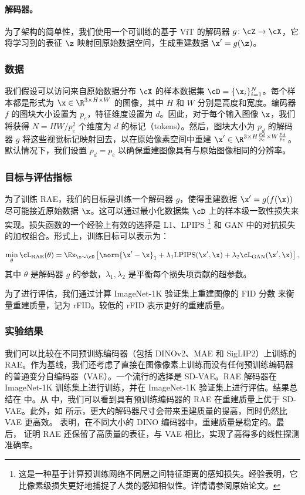 \documentclass[../../book-main_zh.tex]{subfiles}
\begin{document}
\paragraph{解码器。} 为了架构的简单性，我们使用一个可训练的基于 ViT 的解码器 $g \colon \cZ \to \cX$，它将学习到的表征 $\z$ 映射回原始数据空间，生成重建数据 $\x' = g(\z)$。

\subsubsection{数据}
我们假设可以访问来自原始数据分布 $\cX$ 的样本数据集 $\cD = \{\x_i\}_{i=1}^N$。每个样本都是形式为 $\x \in \R^{3 \times H \times W}$ 的图像，其中 $H$ 和 $W$ 分别是高度和宽度。编码器 $f$ 的图块大小设置为 $p_e$，特征维度设置为 $d$。因此，对于每个输入图像 $\x$，我们将获得 $N = HW/p_e^2$ 个维度为 $d$ 的标记（tokens）。然后，图块大小为 $p_d$ 的解码器 $g$ 将这些视觉标记映射回去，以在原始像素空间中重建 $\x' \in \R^{3 \times H\frac{p_d}{p_e} \times W\frac{p_d}{p_e}}$。默认情况下，我们设置 $p_d = p_e$ 以确保重建图像具有与原始图像相同的分辨率。

\subsubsection{目标与评估指标} 为了训练 RAE，我们的目标是训练一个解码器 $g$，使得重建数据 $\x' = g(f(\x))$ 尽可能接近原始数据 $\x$。这可以通过最小化数据集 $\cD$ 上的样本级一致性损失来实现。损失函数的一个经验上有效的选择是 L1、LPIPS \cite{zhang2018unreasonable} \footnote{这是一种基于计算预训练网络不同层之间特征距离的感知损失。经验表明，它比像素级损失更好地捕捉了人类的感知相似性。详情请参阅原始论文。} 和 GAN \cite{goodfellow2014generative} 中的对抗损失的加权组合。形式上，训练目标可以表示为：

\begin{equation}
\min_{\theta} \cL_{\mathrm{RAE}}(\theta) = \Ex_{\x \sim \cD} \left[
    \norm{\x' - \x}_1 + \lambda_1 \mathrm{LPIPS}(\x', \x) + \lambda_2
\cL_{\mathrm{GAN}}(\x', \x) \right],
\end{equation}
其中 $\theta$ 是解码器 $g$ 的参数，$\lambda_1, \lambda_2$ 是平衡每个损失项贡献的超参数。

为了进行评估，我们通过计算 ImageNet-1K 验证集上重建图像的 FID 分数 \cite{heusel2017gans} 来衡量重建质量，记为 rFID。较低的 rFID 表示更好的重建质量。

\subsubsection{实验结果}
我们可以比较在不同预训练编码器（包括 DINOv2、MAE 和 SigLIP2）上训练的 RAE。作为基线，我们还考虑了直接在图像像素上训练而没有任何预训练编码器的普通变分自编码器（VAE）。一个流行的选择是 SD-VAE。RAE 解码器在 ImageNet-1K 训练集上进行训练，并在 ImageNet-1K 验证集上进行评估。结果总结在  中。从  中，我们可以看到具有预训练编码器的 RAE 在重建质量上优于 SD-VAE。此外，如  所示，更大的解码器尺寸会带来重建质量的提高，同时仍然比 VAE 更高效。 表明，在不同大小的 DINO 编码器中，重建质量是稳定的。最后， 证明 RAE 还保留了高质量的表征，与 VAE 相比，实现了高得多的线性探测准确率。
\end{document}

